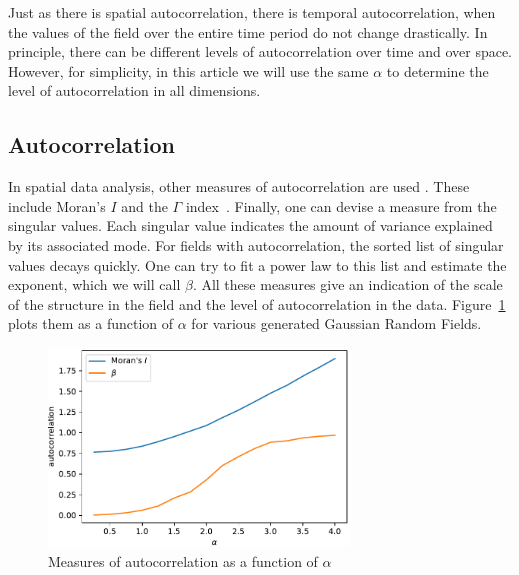 \documentclass[ijgi,article,submit,moreauthors,pdftex,10pt,a4paper]{Definitions/mdpi}
\begin{document}
Just as there is spatial autocorrelation, there is temporal autocorrelation, when the values of the field over the entire time period do not change drastically. In principle, there can be different levels of autocorrelation over time and over space. However, for simplicity, in this article we will use the same $\alpha$ to determine the level of autocorrelation in all dimensions.

\subsection{Autocorrelation}
\label{sec:Materials and Methods/Autocorrelation}

In spatial data analysis, other measures of autocorrelation are used \cite{Eshel2011, Storch1999}. These include Moran's $I$ and the $\Gamma$ index~\cite{Moran1950, Hubert1981, PySAL}. Finally, one can devise a measure from the singular values. Each singular value indicates the amount of variance explained by its associated mode. For fields with autocorrelation, the sorted list of singular values decays quickly. One can try to fit a power law to this list and estimate the exponent, which we will call $\beta$. %
All these measures give an indication of the scale of the structure in the field and the level of autocorrelation in the data. Figure~\ref{fig:plotGammaAndMoransIAndBeta} plots them as a function of $\alpha$ for various generated Gaussian Random Fields.

\begin{figure}[H]
\centering
\includegraphics[width=80mm]{Results/plotMoransIAndBeta.pdf}
\caption[Various measures of autocorrelation]{Measures of autocorrelation as a function of $\alpha$}
\label{fig:plotGammaAndMoransIAndBeta}
\end{figure}
\end{document}
